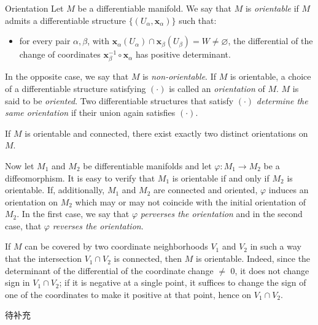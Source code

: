 \documentclass[
	border={25mm 20mm 25mm 30mm},  %
	varwidth,  %
]{standalone}
\begin{document}
\begin{tips}{Orientation}
    Let \(M\) be a differentiable manifold. We say that \(M\) is \textsl{orientable} if \(M\) admits a differentiable structure \(\bigl\{(U_\alpha,\mathbf{x}_\alpha)\bigr\}\) such that:
    \begin{itemize}
        \item for every pair \(\alpha,\beta\), with \(\mathbf{x}_\alpha(U_\alpha)\cap\mathbf{x}_\beta(U_\beta)=W\ne\varnothing\), the differential of the change of coordinates \(\mathbf{x}_\beta^{-1}\circ\mathbf{x}_\alpha\) has positive determinant.
    \end{itemize}
    In the opposite case, we say that \(M\) is \textsl{non-orientable}. If \(M\) is orientable, a choice of a differentiable structure satisfying \((\cdot)\) is called an \textsl{orientation} of \(M\). \(M\) is said to be \textsl{oriented}. Two differentiable structures that satisfy \((\cdot)\) \textsl{determine the same orientation} if their union again satisfies \((\cdot)\).

    If \(M\) is orientable and connected, there exist exactly two distinct orientations on \(M\).

    Now let \(M_1\) and \(M_2\) be differentiable manifolds and let \(\varphi:M_1\to M_2\) be a diffeomorphism. It is easy to verify that \(M_1\) is orientable if and only if \(M_2\) is orientable. If, additionally, \(M_1\) and \(M_2\) are connected and oriented, \(\varphi\) induces an orientation on \(M_2\) which may or may not coincide with the initial orientation of \(M_2\). In the first case, we say that \(\varphi\) \textsl{perverses the orientation} and in the second case, that \(\varphi\) \textsl{reverses the orientation}.
\end{tips}

\begin{tcolorbox}[title = \sffamily{Theorem}, colback=Emerald!10, colframe=cyan!40!black]
    If \(M\) can be covered by two coordinate neighborhoods \(V_1\) and \(V_2\) in such a way that the intersection \(V_1\cap V_2\) is connected, then \(M\) is orientable. Indeed, since the determinant of the differential of the coordinate change \(\ne\) 0, it does not change sign in \(V_1\cap V_2\); if it is negative at a single point, it suffices to change the sign of one of the coordinates to make it positive at that point, hence on \(V_1\cap V_2\).
\end{tcolorbox}

\begin{tcolorbox}[title = \sffamily{Examples}, colback=Salmon!20, colframe=Salmon!90!Black]
    待补充
\end{tcolorbox}
\end{document}

